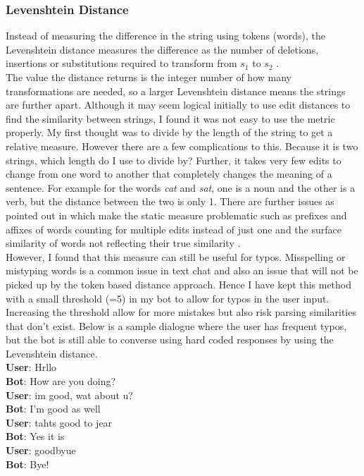 \documentclass{article}
\newcommand{\n}[0]{\\[\baselineskip]}
\begin{document}
\subsubsection{Levenshtein Distance}
Instead of measuring the difference in the string using tokens (words), the Levenshtein distance measures the difference as the number of deletions, insertions or substitutions required to transform from $s_{1}$ to $s_{2}$ \cite{levenshtein}.
\n
The value the distance returns is the integer number of how many transformations are needed, so a larger Levenshtein distance means the strings are further apart. Although it may seem logical initially to use edit distances to find the similarity between strings, I found it was not easy to use the metric properly. My first thought was to divide by the length of the string to get a relative measure. However there are a few complications to this. Because it is two strings, which length do I use to divide by? Further, it takes very few edits to change from one word to another that completely changes the meaning of a sentence. For example for the words \textit{cat} and \textit{sat}, one is a noun and the other is a verb, but the distance between the two is only 1. There are further issues as pointed out in \cite{lev-bad} which make the static measure problematic such as prefixes and affixes of words counting for multiple edits instead of just one and the surface similarity of words not reflecting their true similarity .
\n
However, I found that this measure can still be useful for typos. Misspelling or mistyping words is a common issue in text chat and also an issue that will not be picked up by the token based distance approach. Hence I have kept this method with a small threshold (=5) in my bot to allow for typos in the user input. Increasing the threshold allow for more mistakes but also risk parsing similarities that don't exist. Below is a sample dialogue where the user has frequent typos, but the bot is still able to converse using hard coded responses by using the Levenshtein distance.
\n
\textbf{User}: Hrllo
\\ \textbf{Bot}: How are you doing?
\\ \textbf{User}: im good, wat about u?
\\ \textbf{Bot}: I'm good as well
\\ \textbf{User}: tahts good to jear
\\ \textbf{Bot}: Yes it is
\\ \textbf{User}: goodbyue
\\ \textbf{Bot}: Bye!
\end{document}
